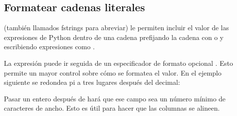 \documentclass[a4,10pt,spanish]{sphinxmanual}
\begin{document}
\subsection{Formatear cadenas literales}
\label{\detokenize{tutorial/inputoutput:formatted-string-literals}}\label{\detokenize{tutorial/inputoutput:tut-f-strings}}
\sphinxAtStartPar
{} (también llamados f\sphinxhyphen{}strings para abreviar) le permiten incluir el valor de las expresiones de Python dentro de una cadena prefijando la cadena con  o  y escribiendo expresiones como .

\sphinxAtStartPar
La expresión puede ir seguida de un especificador de formato opcional . Esto permite un mayor control sobre cómo se formatea el valor. En el ejemplo siguiente se redondea pi a tres lugares después del decimal:

\begin{sphinxVerbatim}[commandchars=\\\{\}]
 
\end{sphinxVerbatim}

\sphinxAtStartPar
Pasar un entero después de  hará que ese campo sea un número mínimo de caracteres de ancho. Esto es útil para hacer que las columnas se alineen.

\begin{sphinxVerbatim}[commandchars=\\\{\}]
       
    
    
\end{sphinxVerbatim}
\end{document}

